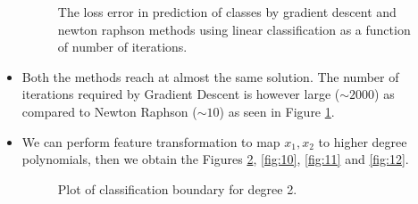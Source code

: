 \documentclass{article}
\begin{document}
\begin{itemize}
\begin{figure}[H]
 \caption{The loss error in prediction of classes by gradient descent and newton raphson methods using linear classification as a function of number of iterations.}
 \label{fig:8}
 \end{figure}
 
 \item Both the methods reach at almost the same solution. The number of iterations required by Gradient Descent is however large ($\sim2000$) as compared to Newton Raphson ($\sim10$) as seen in Figure \ref{fig:8}.
 
 \item We can perform feature transformation to map $x_1, x_2$ to higher degree polynomials, then we obtain the Figures \ref{fig:9}, \ref{fig:10}, \ref{fig:11} and \ref{fig:12}.
 
 \begin{figure}[H]
 \caption{Plot of classification boundary for degree 2.}
 \label{fig:9}
 \end{figure}
 

\end{itemize}
\end{document}
